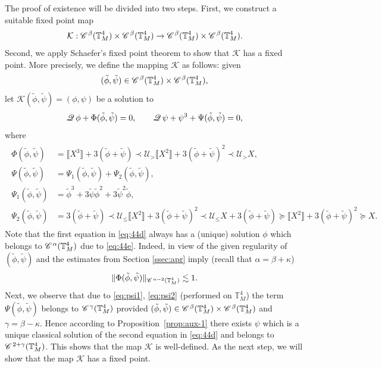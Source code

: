 \documentclass[a4paper,11pt]{article}
\numberwithin{equation}{section}
\newcommand{\CC}{\mathscr{C} \hspace{.1em}}
\newcommand{\UU}{\mathscr{U}}
\newcommand{\Q}{\mathscr{Q} \hspace{.2em}}
\newcommand{\8}{\infty}
\begin{document}
The proof of existence will be divided into two steps. First, we construct a suitable fixed point map
$$\mathcal{K}:\CC^{\beta}(\mathbb{T}_{M}^{4})\times \CC^{\beta}(\mathbb{T}_{M}^{4})\to\CC^{\beta}(\mathbb{T}_{M}^{4})\times \CC^{\beta}(\mathbb{T}_{M}^{4}).$$
Second, we apply Schaefer's fixed point theorem \cite[Section 9.2.2, Theorem 4]{E98} to  show that $\mathcal{K}$ has a fixed point.
More precisely, we define the mapping $\mathcal{K}$ as follows: given
$$(\tilde\phi,\tilde\psi)\in \CC^{\beta}(\mathbb{T}_{M}^{4})\times \CC^{\beta}(\mathbb{T}_{M}^{4}),$$
let $\mathcal{K}(\tilde\phi,\tilde\psi)=(\phi,\psi)$ be a solution to 
\begin{equation}\label{eq:44d}
\Q \phi + \Phi(\tilde\phi,\tilde\psi) = 0, \qquad \Q \psi + \psi^3 + \Psi(\tilde\phi,\tilde\psi) = 0,
\end{equation}
where
\begin{align*}
\begin{aligned}
\Phi(\tilde\phi,\tilde\psi)&= \llbracket X^3 \rrbracket + 3 (\tilde\phi + \tilde\psi) \prec \UU_{>}
   \llbracket X^2 \rrbracket + 3 (\tilde\phi + \tilde\psi)^2 \prec \UU_{>} X,\\
\Psi(\tilde\phi,\tilde\psi)&= \Psi_1(\tilde\phi,\tilde\psi) + \Psi_2(\tilde\phi,\tilde\psi), \\
 \Psi_{1}(\tilde\phi,\tilde\psi)&=\tilde\phi^3 + 3 \tilde\psi \tilde\phi^2 + 3 \tilde\psi^2 \tilde\phi,\\
\Psi_{2}(\tilde\phi,\tilde\psi)&= 3 (\tilde\phi + \tilde\psi) \prec \UU_{\leqslant} \llbracket X^2
   \rrbracket + 3 (\tilde\phi + \tilde\psi)^2 \prec \UU_{\leqslant} X + 3 (\tilde\phi +
   \tilde\psi) \succcurlyeq \llbracket X^2 \rrbracket + 3 (\tilde\phi + \tilde\psi)^2
   \succcurlyeq X.
\end{aligned}
\end{align*}   
Note that the first equation in \eqref{eq:44d} always has a (unique) solution $\phi$ which belongs to $\CC^{\alpha}(\mathbb{T}_{M}^{4})$  due to \eqref{eq:44e}. Indeed, in view of the given regularity of $(\tilde\phi,\tilde\psi)$ and the estimates from Section \ref{ssec:apr} imply  (recall that $\alpha=\beta+\kappa$)
$$
\|\Phi(\tilde\phi,\tilde\psi)\|_{\CC^{\alpha-2}(\mathbb{T}_{M}^{4})}\lesssim 1.
$$
Next,  we observe that due to \eqref{eq:psi1}, \eqref{eq:psi2} (performed on $\mathbb{T}^{4}_{M}$) the term $\Psi(\tilde\phi,\tilde\psi)$ belongs to $\CC^{\gamma}(\mathbb{T}^{4}_{M})$ provided   $(\tilde\phi,\tilde\psi)\in \CC^{\beta}(\mathbb{T}^{4}_{M})\times \CC^{\beta} (\mathbb{T}^{4}_{M})$ and $\gamma=\beta-\kappa$. Hence according to Proposition~\ref{prop:aux-1} there exists $\psi$ which is a unique classical solution of the second equation in \eqref{eq:44d} and belongs to $\CC^{2+\gamma}(\mathbb{T}_{M}^{4})$. This shows that the map $\mathcal{K}$ is well-defined.
As the next step, we will show that the map $\mathcal{K}$ has a fixed point.
\end{document}
